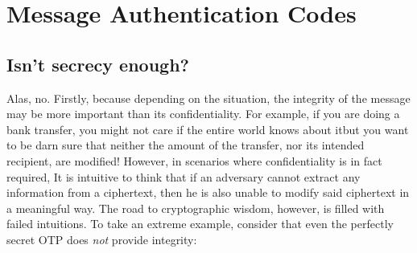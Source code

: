 
\chapter{Message Authentication Codes}
\label{cha:MAC}

\section{Isn't secrecy enough?}
  \label{sec:mac_vs_secrecy}
  Alas, no. Firstly, because depending on the situation, the integrity of the message may be more important than its confidentiality. For example, if you are doing a bank transfer, you might not care if the entire world knows about it\emd but you want to be darn sure that neither the amount of the transfer, nor its intended recipient, are modified! However, in scenarios where confidentiality is in fact required, It is intuitive to think that if an adversary cannot extract any information from a ciphertext, then he is also unable to modify said ciphertext in a meaningful way. The road to cryptographic wisdom, however, is filled with failed intuitions. To take an extreme example, consider that even the perfectly secret OTP does \emph{not} provide integrity:

